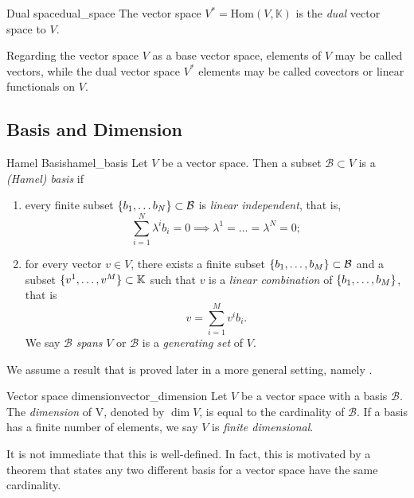\begin{definition}{Dual space}{dual_space}
    The vector space \(V^\ast = \mathrm{Hom}(V, \mathbb{K})\) is the \emph{dual} vector space to \(V\).
\end{definition}
\begin{remark}
    Regarding the vector space \(V\) as a base vector space, elements of \(V\) may be called vectors, while the dual vector space \(V ^{\ast}\) elements may be called covectors or linear functionals on \(V\).
\end{remark}

\subsection{Basis and Dimension}

\begin{definition}{Hamel Basis}{hamel_basis}
    Let \(V\) be a vector space. Then a subset \(\mathcal{B} \subset V\) is a \emph{(Hamel) basis} if
    \begin{enumerate}[label=(\alph*)]
        \item every finite subset \(\{b_1, \dots b_N\} \subset \mathcal{B}\) is \emph{linear independent}, that is,
            \begin{equation*}
                \sum_{i = 1}^N \lambda^i b_i = 0 \implies \lambda^1 = \dots = \lambda^N = 0;
            \end{equation*}
        \item for every vector \(v \in V\), there exists a finite subset \(\{b_1, \dots, b_M\} \subset \mathcal{B}\) and a subset \(\{v^1, \dots, v^M\} \subset \mathbb{K}\) such that \(v\) is a \emph{linear combination} of \(\{b_1, \dots, b_M\}\), that is
        \begin{equation*}
            v = \sum_{i=1}^M v^ib_i.
        \end{equation*}
        We say \(\mathcal{B}\) \emph{spans} \(V\) or \(\mathcal{B}\) is a \emph{generating set} of \(V\).
    \end{enumerate}
\end{definition}

We assume a result that is proved later in a more general setting, namely .

\begin{definition}{Vector space dimension}{vector_dimension}
    Let \(V\) be a vector space with a basis \(\mathcal{B}\). The \emph{dimension} of V, denoted by \(\dim{V}\), is equal to the cardinality of \(\mathcal{B}\). If a basis has a finite number of elements, we say \(V\) is \emph{finite dimensional}.
\end{definition}
\begin{remark}
    It is not immediate that this is well-defined. In fact, this is motivated by a theorem that  states any two different basis for a vector space have the same cardinality.
\end{remark}

